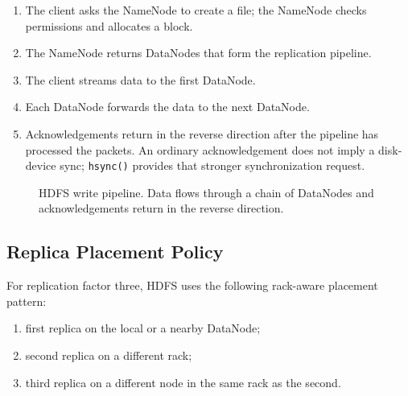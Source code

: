 \documentclass[11pt,a4paper,oneside]{book}
\begin{document}
\begin{enumerate}
    \item The client asks the NameNode to create a file; the NameNode checks permissions and allocates a block.
    \item The NameNode returns DataNodes that form the replication pipeline.
    \item The client streams data to the first DataNode.
    \item Each DataNode forwards the data to the next DataNode.
    \item Acknowledgements return in the reverse direction after the pipeline has processed the packets. An ordinary acknowledgement does not imply a disk-device sync; \texttt{hsync()} provides that stronger synchronization request.
\end{enumerate}

\begin{figure}[htbp]
\centering
{}
\caption{HDFS write pipeline. Data flows through a chain of DataNodes and acknowledgements return in the reverse direction.}
\label{fig:hdfs-write}
\end{figure}

\subsection{Replica Placement Policy}

For replication factor three, HDFS uses the following rack-aware placement pattern:

\begin{enumerate}
    \item first replica on the local or a nearby DataNode;
    \item second replica on a different rack;
    \item third replica on a different node in the same rack as the second.
\end{enumerate}
\end{document}
